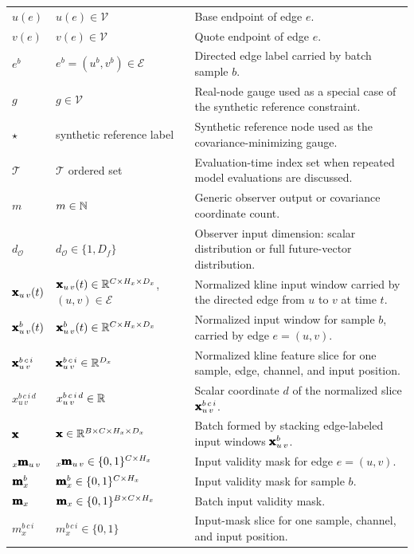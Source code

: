 \begin{center}
\begin{longtable}{>{\raggedright\arraybackslash}p{}
                  >{\raggedright\arraybackslash}p{}
                  >{\raggedright\arraybackslash}p{}}
$u(e)$ & $u(e)\in\mathcal{V}$ & Base endpoint of edge $e$. \\
$v(e)$ & $v(e)\in\mathcal{V}$ & Quote endpoint of edge $e$. \\
$e^b$ & $e^b=(u^b,v^b)\in\mathcal{E}$ & Directed edge label carried by batch sample $b$. \\
$g$ & $g \in \mathcal{V}$ & Real-node gauge used as a special case of the synthetic reference constraint. \\
$\star$ & synthetic reference label & Synthetic reference node used as the covariance-minimizing gauge. \\
\midrule
$\mathcal{T}$ & $\mathcal{T}$ ordered set & Evaluation-time index set when repeated model evaluations are discussed. \\
$m$ & $m \in \mathbb{N}$ & Generic observer output or covariance coordinate count. \\
$d_{\mathcal{O}}$ & $d_{\mathcal{O}} \in \{1,D_f\}$ & Observer input dimension: scalar distribution or full future-vector distribution. \\
\midrule
$\pmb{\mathbf{x}}_{u\,v}(t)$ & $\pmb{\mathbf{x}}_{u\,v}(t) \in \mathbb{R}^{C \times H_x \times D_x}$, $(u,v) \in \mathcal{E}$ & Normalized kline input window carried by the directed edge from $u$ to $v$ at time $t$. \\
$\pmb{\mathbf{x}}_{u\,v}^{b}(t)$ & $\pmb{\mathbf{x}}_{u\,v}^{b}(t) \in \mathbb{R}^{C \times H_x \times D_x}$ & Normalized input window for sample $b$, carried by edge $e=(u,v)$. \\
$\pmb{\mathbf{x}}_{u\,v}^{b\,c\,i}$ & $\pmb{\mathbf{x}}_{u\,v}^{b\,c\,i} \in \mathbb{R}^{D_x}$ & Normalized kline feature slice for one sample, edge, channel, and input position. \\
$x_{u\,v}^{b\,c\,i\,d}$ & $x_{u\,v}^{b\,c\,i\,d} \in \mathbb{R}$ & Scalar coordinate $d$ of the normalized slice $\pmb{\mathbf{x}}_{u\,v}^{b\,c\,i}$. \\
$\pmb{\mathbf{x}}$ & $\pmb{\mathbf{x}} \in \mathbb{R}^{B \times C \times H_x \times D_x}$ & Batch formed by stacking edge-labeled input windows $\pmb{\mathbf{x}}_{u\,v}^{b}$. \\
${}_{x}\pmb{\mathbf{m}}_{u\,v}$ & ${}_{x}\pmb{\mathbf{m}}_{u\,v} \in \{0,1\}^{C \times H_x}$ & Input validity mask for edge $e=(u,v)$. \\
$\pmb{\mathbf{m}}_x^{b}$ & $\pmb{\mathbf{m}}_x^{b} \in \{0,1\}^{C \times H_x}$ & Input validity mask for sample $b$. \\
$\pmb{\mathbf{m}}_x$ & $\pmb{\mathbf{m}}_x \in \{0,1\}^{B \times C \times H_x}$ & Batch input validity mask. \\
$m_x^{b\,c\,i}$ & $m_x^{b\,c\,i} \in \{0,1\}$ & Input-mask slice for one sample, channel, and input position. \\

\end{longtable}
\end{center}
